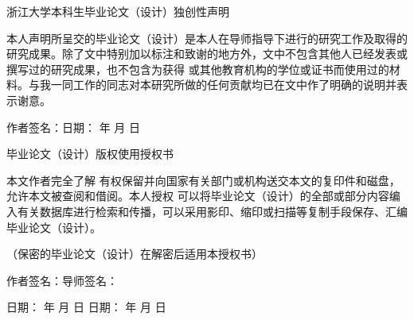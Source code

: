 \thispagestyle{empty}

{
\setlength{\parindent}{0em}
\renewcommand{\baselinestretch}{1.5}

\vspace*{1mm}

{
\centering
  \songti\xiaoer 浙江大学本科生毕业论文（设计）独创性声明 \par
}

\vspace{2em}

{
\songti\xiaosi
\setlength{\parindent}{2em}
本人声明所呈交的毕业论文（设计）是本人在导师指导下进行的研究工作及取得的研究成果。除了文中特别加以标注和致谢的地方外，文中不包含其他人已经发表或撰写过的研究成果，也不包含为获得 \textbf{\underline{}} 或其他教育机构的学位或证书而使用过的材料。与我一同工作的同志对本研究所做的任何贡献均已在文中作了明确的说明并表示谢意。
\\
\begin{flushleft}
作者签名：\hspace{15.5em}日期：\hspace{4em} 年 \hspace{2em}月 \hspace{2em} 日
\end{flushleft}

}
\vspace{2em}
{
\centering
  \songti\xiaoer 毕业论文（设计）版权使用授权书 \par
}

\vspace{2em}

{
\songti\xiaosi
\setlength{\parindent}{2em}
本文作者完全了解 \textbf{\underline{}}   有权保留并向国家有关部门或机构送交本文的复印件和磁盘，允许本文被查阅和借阅。本人授权\textbf{\underline{}} 可以将毕业论文（设计）的全部或部分内容编入有关数据库进行检索和传播，可以采用影印、缩印或扫描等复制手段保存、汇编毕业论文（设计）。

（保密的毕业论文（设计）在解密后适用本授权书）
\begin{flushleft}
作者签名：\hspace{15em}导师签名：
\end{flushleft}

  
\begin{flushleft}
日期：\hspace{4em} 年 \hspace{2em}月 \hspace{2em} 日
\hspace{4em}日期：\hspace{4em} 年 \hspace{2em}月 \hspace{2em} 日

\end{flushleft}

}

}
